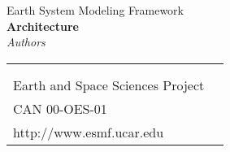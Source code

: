 \documentclass[]{article}
\begin{document}

\begin{titlepage}

\begin{center}
{\Large Earth System Modeling Framework } \\
\vspace{.25in}
{\Large {\bf <Module, Library, Component or Model Name> Architecture}} \\
\vspace{.25in}
{\large {\it Authors}}
\vspace{.5in}
\end{center}

\begin{latexonly}
\vspace{5.5in}
\begin{tabular}{p{5in}p{.9in}}
\hrulefill \\
\noindent {\bf NASA High Performance Computing and Communications Program} \\
\noindent Earth and Space Sciences Project \\
\noindent CAN 00-OES-01 \\
\noindent http://www.esmf.ucar.edu \\
\end{tabular}
\end{latexonly}

\end{titlepage}

\tableofcontents

\newpage



%

%


\end{document}
